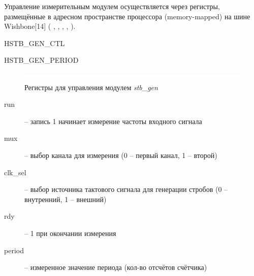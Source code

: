 Управление измерительным модулем осуществляется через регистры, размещённые в адресном пространстве процессора (memory-mapped) на шине Wishbone[14] ( , ,
, , ).

\begin{register}{H}{STB\_GEN\_CTL}{}%
\label{example}%
%
%
%
%
 \regnewline%

%
%
%
%
\regnewline%
\end{register}

\begin{register}{H}{STB\_GEN\_PERIOD}{}%
\label{example}%
%
 \regnewline%
\end{register}

\begin{figure}[ht!] 
	\center
	\includegraphics  {my_folder/images//blank}
	\caption{Регистры для управления модулем \emph{stb\_gen}} 
	\label{fig:stb-reg}  
\end{figure}


\begin{description}
	\item [run] -- запись 1 начинает измерение частоты входного сигнала
	\item [mux] -- выбор канала для измерения (0 -- первый канал, 1 -- второй)
	\item [clk\_sel] -- выбор источника тактового сигнала для генерации стробов (0 -- внутренний, 1 -- внешний)
	\item [rdy] -- 1 при окончании измерения
	\item [period] -- измеренное значение периода (кол-во отсчётов счётчика)\\
\end{description}

